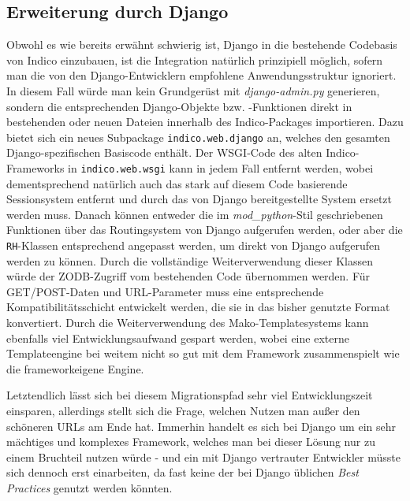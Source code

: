 \subsection{Erweiterung durch Django}
Obwohl es wie bereits erwähnt schwierig ist, Django in die bestehende Codebasis von Indico
einzubauen, ist die Integration natürlich prinzipiell möglich, sofern man die von den
Django-Entwicklern empfohlene Anwendungsstruktur ignoriert. In diesem Fall würde man kein
Grundgerüst mit \emph{django-admin.py} generieren, sondern die entsprechenden Django-Objekte bzw.
-Funktionen direkt in bestehenden oder neuen Dateien innerhalb des Indico-Packages importieren.
Dazu bietet sich ein neues Subpackage \lstinline{indico.web.django} an, welches den gesamten
Django-spezifischen Basiscode enthält. Der WSGI-Code des alten Indico-Frameworks in
\lstinline{indico.web.wsgi} kann in jedem Fall entfernt werden, wobei dementsprechend natürlich auch
das stark auf diesem Code basierende Sessionsystem entfernt und durch das von Django
bereitgestellte System ersetzt werden muss. Danach können entweder die im \emph{mod\_python}-Stil
geschriebenen Funktionen über das Routingsystem von Django aufgerufen werden, oder aber die
\lstinline{RH}-Klassen entsprechend angepasst werden, um direkt von Django aufgerufen werden zu
können. Durch die vollständige Weiterverwendung dieser Klassen würde der ZODB-Zugriff vom
bestehenden Code übernommen werden. Für GET/POST-Daten und URL-Parameter muss eine
entsprechende Kompatibilitätsschicht entwickelt werden, die sie in das bisher genutzte Format
konvertiert. Durch die Weiterverwendung des Mako-Templatesystems kann ebenfalls viel
Entwicklungsaufwand gespart werden, wobei eine externe Templateengine bei weitem nicht so
gut mit dem Framework zusammenspielt wie die frameworkeigene Engine.

Letztendlich lässt sich bei diesem Migrationspfad sehr viel Entwicklungszeit einsparen, allerdings
stellt sich die Frage, welchen Nutzen man außer den schöneren URLs am Ende hat. Immerhin handelt es
sich bei Django um ein sehr mächtiges und komplexes Framework, welches man bei dieser Lösung nur zu
einem Bruchteil nutzen würde - und ein mit Django vertrauter Entwickler müsste sich dennoch erst
einarbeiten, da fast keine der bei Django üblichen \emph{Best Practices} genutzt werden könnten.


